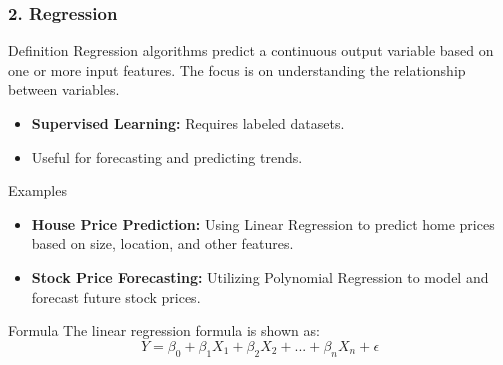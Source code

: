 \documentclass[aspectratio=169]{beamer}
\begin{document}
\begin{frame}[fragile]
    \frametitle{2. Regression}
    \begin{block}{Definition}
        Regression algorithms predict a continuous output variable based on one or more input features. The focus is on understanding the relationship between variables.
    \end{block}
    
    \begin{itemize}
        \item \textbf{Supervised Learning:} Requires labeled datasets.
        \item Useful for forecasting and predicting trends.
    \end{itemize}

    \begin{block}{Examples}
        \begin{itemize}
            \item \textbf{House Price Prediction:} Using Linear Regression to predict home prices based on size, location, and other features.
            \item \textbf{Stock Price Forecasting:} Utilizing Polynomial Regression to model and forecast future stock prices.
        \end{itemize}
    \end{block}

    \begin{block}{Formula}
        The linear regression formula is shown as:
        \begin{equation}
            Y = \beta_0 + \beta_1X_1 + \beta_2X_2 + ... + \beta_nX_n + \epsilon
        \end{equation}
    \end{block}
\end{frame}
\end{document}
